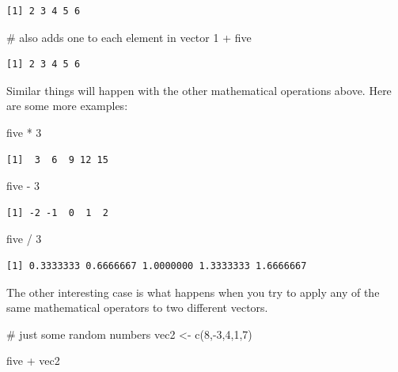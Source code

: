 \documentclass[
  letterpaper,
  DIV=11,
  numbers=noendperiod]{scrreprt}
\newenvironment{Shaded}{\begin{snugshade}}{\end{snugshade}}
\newcommand{\CommentTok}[1]{\textcolor[rgb]{0.37,0.37,0.37}{#1}}
\newcommand{\DecValTok}[1]{\textcolor[rgb]{0.68,0.00,0.00}{#1}}
\newcommand{\FunctionTok}[1]{\textcolor[rgb]{0.28,0.35,0.67}{#1}}
\newcommand{\NormalTok}[1]{\textcolor[rgb]{0.00,0.23,0.31}{#1}}
\newcommand{\OtherTok}[1]{\textcolor[rgb]{0.00,0.23,0.31}{#1}}
\newcommand{\SpecialCharTok}[1]{\textcolor[rgb]{0.37,0.37,0.37}{#1}}
\begin{document}
\begin{verbatim}
[1] 2 3 4 5 6
\end{verbatim}

\begin{Shaded}
\begin{Highlighting}[]
\CommentTok{\# also adds one to each element in vector}
\DecValTok{1} \SpecialCharTok{+}\NormalTok{ five}
\end{Highlighting}
\end{Shaded}

\begin{verbatim}
[1] 2 3 4 5 6
\end{verbatim}

Similar things will happen with the other mathematical operations above.
Here are some more examples:

\begin{Shaded}
\begin{Highlighting}[]
\NormalTok{five }\SpecialCharTok{*} \DecValTok{3}
\end{Highlighting}
\end{Shaded}

\begin{verbatim}
[1]  3  6  9 12 15
\end{verbatim}

\begin{Shaded}
\begin{Highlighting}[]
\NormalTok{five }\SpecialCharTok{{-}} \DecValTok{3}
\end{Highlighting}
\end{Shaded}

\begin{verbatim}
[1] -2 -1  0  1  2
\end{verbatim}

\begin{Shaded}
\begin{Highlighting}[]
\NormalTok{five }\SpecialCharTok{/} \DecValTok{3}
\end{Highlighting}
\end{Shaded}

\begin{verbatim}
[1] 0.3333333 0.6666667 1.0000000 1.3333333 1.6666667
\end{verbatim}

The other interesting case is what happens when you try to apply any of
the same mathematical operators to two different vectors.

\begin{Shaded}
\begin{Highlighting}[]
\CommentTok{\# just some random numbers}
\NormalTok{vec2 }\OtherTok{\textless{}{-}} \FunctionTok{c}\NormalTok{(}\DecValTok{8}\NormalTok{,}\SpecialCharTok{{-}}\DecValTok{3}\NormalTok{,}\DecValTok{4}\NormalTok{,}\DecValTok{1}\NormalTok{,}\DecValTok{7}\NormalTok{)}

\NormalTok{five }\SpecialCharTok{+}\NormalTok{ vec2}
\end{Highlighting}
\end{Shaded}
\end{document}
